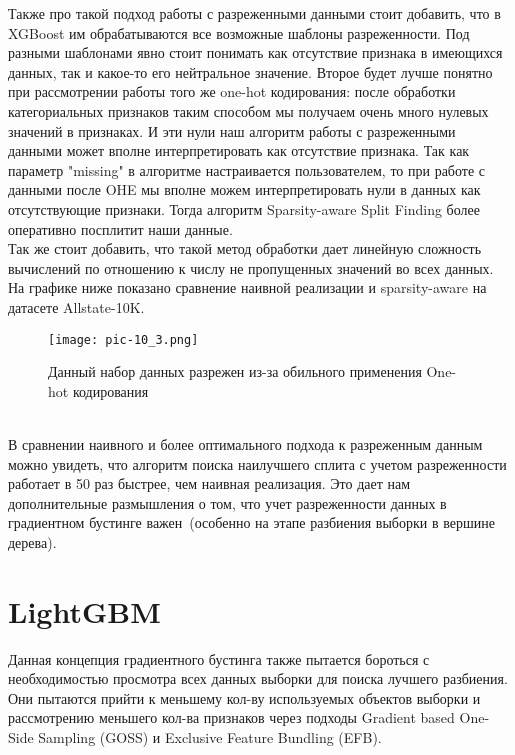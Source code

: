 \documentclass[12pt,fleqn]{article}
\begin{document}
Также про такой подход работы с разреженными данными стоит добавить, что в XGBoost им обрабатываются все возможные шаблоны разреженности. Под разными шаблонами явно стоит понимать как отсутствие признака в имеющихся данных, так и какое-то его нейтральное значение. Второе будет лучше понятно при рассмотрении работы того же one-hot кодирования: после обработки категориальных признаков таким способом мы получаем очень много нулевых значений в признаках. И эти нули наш алгоритм работы с разреженными данными может вполне интерпретировать как отсутствие признака. Так как параметр "missing" в алгоритме настраивается пользователем, то при работе с данными после OHE мы вполне можем интерпретировать нули в данных как отсутствующие признаки. Тогда алгоритм Sparsity-aware Split Finding более оперативно посплитит наши данные.\\

Так же стоит добавить, что такой метод обработки дает линейную сложность вычислений по отношению к числу не пропущенных значений во всех данных. На графике ниже показано сравнение наивной реализации и sparsity-aware на датасете Allstate-10K.
\begin{figure}[h]
	\centering
	\texttt{[image: pic-10\_3.png]}
	\caption{Данный набор данных разрежен из-за обильного применения One-hot кодирования}
	\label{fig:terms_3}
\end{figure}\\
В сравнении наивного и более оптимального подхода к разреженным данным можно увидеть, что алгоритм поиска наилучшего сплита с учетом разреженности работает в 50 раз быстрее, чем наивная реализация. Это дает нам дополнительные размышления о том, что учет разреженности данных в градиентном бустинге важен~(особенно на этапе разбиения выборки в вершине дерева).
\section{LightGBM}
Данная концепция градиентного бустинга также пытается бороться с необходимостью просмотра всех данных выборки для поиска лучшего разбиения. Они пытаются прийти к меньшему кол-ву используемых объектов выборки и рассмотрению меньшего кол-ва признаков через подходы Gradient based One-Side Sampling (GOSS) и  Exclusive Feature Bundling (EFB).
\end{document}
